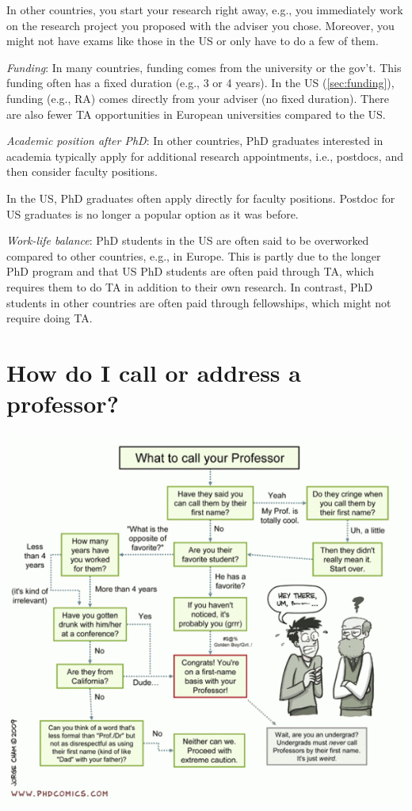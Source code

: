 \documentclass[oneside,11pt,dvipsnames]{book}
\begin{document}
In other countries, you start your research right away, e.g., you immediately work on the research project you proposed with the adviser you chose. Moreover, you might not have exams like those in the US or only have to do a few of them.

\emph{Funding}:  In many countries, funding comes from the university or the gov't. This funding often has a fixed duration (e.g., 3 or 4 years).  In the US (\autoref{sec:funding}), funding (e.g., RA) comes directly from your adviser (no fixed duration).  There are also fewer TA opportunities in European universities compared to the US.

\emph{Academic position after PhD}: In other countries, PhD graduates interested in academia typically apply for additional research appointments, i.e., postdocs, and then consider faculty positions. 

In the US, PhD graduates often apply directly for faculty positions. Postdoc for US graduates is no longer a popular option as it was before.

\emph{Work-life balance}: PhD students in the US are often said to be overworked compared to other countries, e.g., in Europe.  This is partly due to the longer PhD program and that US PhD students are often paid through TA, which requires them to do TA in addition to their own research. In contrast, PhD students in other countries are often paid through fellowships, which might not require doing TA.



\section{How do I call or address a professor?}\label{sec:address}

\begin{center}
  \includegraphics[scale=0.5]{files/c5.png}
\end{center}
\end{document}
